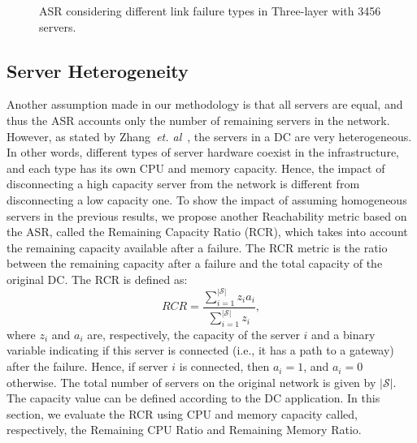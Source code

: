 \begin{figure}[h!]
\centering
{}
\caption{ASR considering different link failure types in Three-layer with 3456 servers.}
\end{figure}
 
 
\subsection{Server Heterogeneity} 
\label{sec:hetServers}

Another assumption made in our methodology is that all servers are equal, and thus the ASR accounts only the number of remaining servers in the network. However, as stated by Zhang~\textit{et. al}~\cite{zhang2014Dynamic}, the servers in a DC are very heterogeneous. In other words, different types of server hardware coexist in the infrastructure, and each type has its own CPU and memory capacity. Hence, the impact of disconnecting a high capacity server from the network is different from disconnecting a low capacity one. To show the impact of assuming homogeneous servers in the previous results, we propose another Reachability metric based on the ASR, called the Remaining Capacity Ratio (RCR), which takes into account the remaining capacity available after a failure.
The RCR metric is the ratio between the remaining capacity after a failure and the total capacity of the original DC. The RCR is defined as:
\begin{equation}
RCR=\frac{\sum_{i=1}^{|\mathcal{S}|}z_i a_i}{\sum_{i=1}^{|\mathcal{S}|}z_i},
\end{equation}
where $z_i$ and $a_i$ are, respectively, the capacity of the server $i$ and a binary variable indicating if this server is connected (i.e., it has a path to a gateway) after the failure. Hence, if server $i$ is connected, then $a_i=1$, and $a_i=0$ otherwise. The total number of servers on the original network is given by $|\mathcal{S}|$. The capacity value can be defined according to the DC application. In this section, we evaluate the RCR using CPU and memory capacity called, respectively, the Remaining CPU Ratio and Remaining Memory Ratio.

